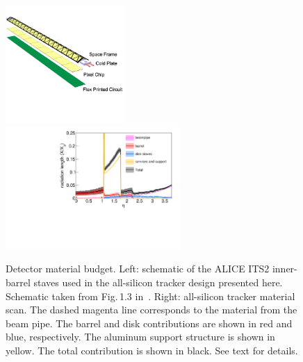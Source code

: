 \begin{figure}[htbp]
    \centering
    \includegraphics[width=0.40\textwidth]{EIC_Jets/alice_its2_stave.jpg}
    \includegraphics[width=0.59\textwidth]{EIC_Jets/mat_scan.pdf}
    \caption{Detector material budget.
    Left: schematic of the ALICE ITS2 inner-barrel staves used in the all-silicon tracker design presented here. Schematic taken from Fig.\,1.3 in~\cite{Abelevetal:2014dna}.
    Right: all-silicon tracker material scan.
    The dashed magenta line corresponds to the material from the beam pipe.
    The barrel and disk contributions are shown in red and blue, respectively.
    The aluminum support structure is shown in yellow.
    The total contribution is shown in black.
    See text for details.
    }
    \label{fig:material}
\end{figure}

